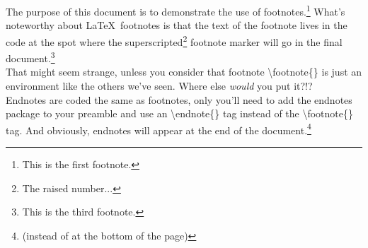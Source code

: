 \documentclass{article}
\begin{document}
The purpose of this document is to demonstrate the use of footnotes.\footnote{This is the first footnote.} What's noteworthy about \LaTeX\ footnotes is that the text of the footnote lives in the code at the spot where the superscripted\footnote{The raised number...} footnote marker will go in the final document.\footnote{This is the third footnote.} \\

That might seem strange, unless you consider that footnote \textbackslash footnote\{\} is just an environment like the others we've seen. Where else \textit{would} you put it?!? \\

Endnotes are coded the same as footnotes, only you'll need to add the endnotes package to your preamble and use an \textbackslash endnote\{\} tag instead of the \textbackslash footnote\{\} tag. And obviously, endnotes will appear at the end of the document.\footnote{(instead of at the bottom of the page)} \\
\end{document}
